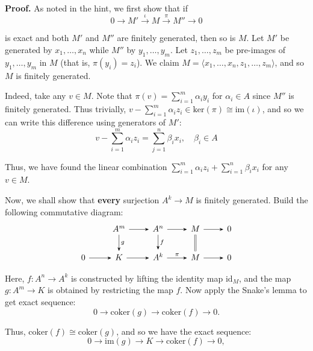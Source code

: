 \documentclass{template}
\begin{document}
\textbf{Proof.} As noted in the hint, we first show that if
\begin{equation*}
    0 \to M' \xrightarrow{\iota} M \xrightarrow{\pi} M'' \to 0
\end{equation*}

is exact and both $M'$ and $M''$ are finitely generated, then so is $M$. Let
$M'$ be generated by $x_1,\dots,x_n$ while $M''$ by $y_1,\dots,y_m$. Let
$z_1,\dots,z_m$ be pre-images of $y_1,\dots,y_m$ in $M$ (that is,
$\pi(y_i)=z_i$). We claim $M = \langle x_1,\dots,x_n,z_1,\dots,z_m \rangle$, and
so $M$ is finitely generated. 

Indeed, take any $v \in M$. Note that $\pi(v) = \sum_{i=1}^m \alpha_i y_i$ for
$\alpha_i \in A$ since $M''$ is finitely generated. Thus trivially, $v -
\sum_{i=1}^m \alpha_i z_i \in \text{ker}(\pi) \cong \text{im}(\iota)$, and 
so we can write this difference using generators of $M'$:
\begin{equation*}
    v - \sum_{i=1}^m \alpha_i z_i = \sum_{j=1}^n \beta_i x_i, \quad \beta_i \in A
\end{equation*}

Thus, we have found the linear combination $\sum_{i=1}^m\alpha_i z_i +
\sum_{i=1}^n \beta_i x_i$ for any $v \in M$.

Now, we shall show that \textbf{every} surjection $A^k \to M$ is finitely
generated. Build the following commutative diagram:
\[
    \begin{tikzcd}
        & A^m \arrow[-Stealth]{d}{g} \arrow[-Stealth]{r}{} & A^n \arrow[-Stealth]{d}{f} \arrow[-Stealth]{r}{} & M \arrow[equal]{d}{} \arrow[-Stealth]{r}{} & 0 \\
        0 \arrow[-Stealth]{r}{} & K \arrow[-Stealth]{r}{} & A^k \arrow[-Stealth]{r}{\pi} & M \arrow[-Stealth]{r}{} & 0
    \end{tikzcd}
\]

Here, $f: A^n \to A^k$ is constructed by lifting the identity map $\text{id}_M$,
and the map $g: A^m \to K$ is obtained by restricting the map $f$. Now apply 
the Snake's lemma to get exact sequence:
\begin{equation*}
    0 \to \text{coker}(g) \to \text{coker}(f) \to 0.
\end{equation*}

Thus, $\text{coker}(f) \cong \text{coker}(g)$, and so we have the exact sequence:
\begin{equation*}
    0 \to \text{im}(g) \to K \to \text{coker}(f) \to 0,
\end{equation*} 
\end{document}
